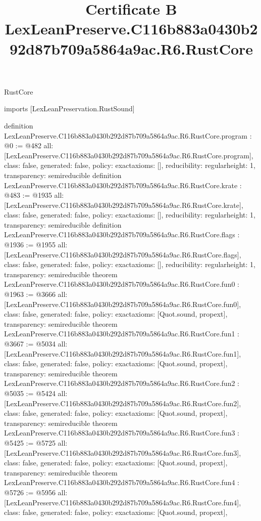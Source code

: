 \begin{lexlean}{RustCore}
\title{Certificate B LexLeanPreserve.C116b883a0430b292d87b709a5864a9ac.R6.RustCore}
\begin{coremodule}
imports [LexLeanPreservation.RustSound]

definition LexLeanPreserve.C116b883a0430b292d87b709a5864a9ac.R6.RustCore.program : @0 := @482 {
  all: [LexLeanPreserve.C116b883a0430b292d87b709a5864a9ac.R6.RustCore.program],
  class: false,
  generated: false,
  policy: exact{axioms: []},
  reducibility: regular{height: 1},
  transparency: semireducible
}
definition LexLeanPreserve.C116b883a0430b292d87b709a5864a9ac.R6.RustCore.krate : @483 := @1935 {
  all: [LexLeanPreserve.C116b883a0430b292d87b709a5864a9ac.R6.RustCore.krate],
  class: false,
  generated: false,
  policy: exact{axioms: []},
  reducibility: regular{height: 1},
  transparency: semireducible
}
definition LexLeanPreserve.C116b883a0430b292d87b709a5864a9ac.R6.RustCore.flags : @1936 := @1955 {
  all: [LexLeanPreserve.C116b883a0430b292d87b709a5864a9ac.R6.RustCore.flags],
  class: false,
  generated: false,
  policy: exact{axioms: []},
  reducibility: regular{height: 1},
  transparency: semireducible
}
theorem LexLeanPreserve.C116b883a0430b292d87b709a5864a9ac.R6.RustCore.fun0 : @1963 := @3666 {
  all: [LexLeanPreserve.C116b883a0430b292d87b709a5864a9ac.R6.RustCore.fun0],
  class: false,
  generated: false,
  policy: exact{axioms: [Quot.sound, propext]},
  transparency: semireducible
}
theorem LexLeanPreserve.C116b883a0430b292d87b709a5864a9ac.R6.RustCore.fun1 : @3667 := @5034 {
  all: [LexLeanPreserve.C116b883a0430b292d87b709a5864a9ac.R6.RustCore.fun1],
  class: false,
  generated: false,
  policy: exact{axioms: [Quot.sound, propext]},
  transparency: semireducible
}
theorem LexLeanPreserve.C116b883a0430b292d87b709a5864a9ac.R6.RustCore.fun2 : @5035 := @5424 {
  all: [LexLeanPreserve.C116b883a0430b292d87b709a5864a9ac.R6.RustCore.fun2],
  class: false,
  generated: false,
  policy: exact{axioms: [Quot.sound, propext]},
  transparency: semireducible
}
theorem LexLeanPreserve.C116b883a0430b292d87b709a5864a9ac.R6.RustCore.fun3 : @5425 := @5725 {
  all: [LexLeanPreserve.C116b883a0430b292d87b709a5864a9ac.R6.RustCore.fun3],
  class: false,
  generated: false,
  policy: exact{axioms: [Quot.sound, propext]},
  transparency: semireducible
}
theorem LexLeanPreserve.C116b883a0430b292d87b709a5864a9ac.R6.RustCore.fun4 : @5726 := @5956 {
  all: [LexLeanPreserve.C116b883a0430b292d87b709a5864a9ac.R6.RustCore.fun4],
  class: false,
  generated: false,
  policy: exact{axioms: [Quot.sound, propext]},
}
\end{coremodule}
\end{lexlean}
